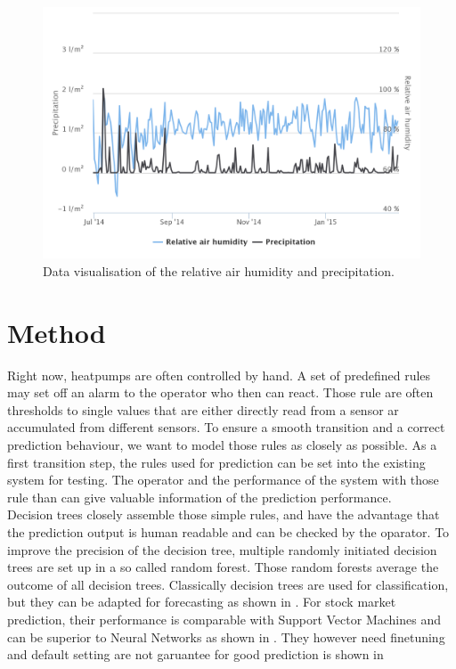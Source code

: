 \documentclass{scrartcl}
\begin{document}
\begin{figure}[H]
  \centering
  \includegraphics[width=0.8\linewidth]{img/humidity.png}
  \caption{Data visualisation of the relative air humidity and precipitation.}
  \label{fig:humidity}
\end{figure}


\section{Method}
Right now, heatpumps are often controlled by hand. A set of predefined rules may set off an alarm to the operator who then can react. Those rule are often thresholds to single values that are either directly read from a sensor ar accumulated from different sensors. To ensure a smooth transition and a correct prediction behaviour, we want to model those rules as closely as possible. As a first transition step, the rules used for prediction can be set into the existing system for testing. The operator and the performance of the system with those rule than can give valuable information of the prediction performance.\\
Decision trees closely assemble those simple rules, and have the advantage that the prediction output is human readable and can be checked by the oparator. To improve the precision of the decision tree, multiple randomly initiated decision trees are set up in a so called random forest. Those random forests average the outcome of all decision trees. Classically decision trees are used for classification, but they can be adapted for forecasting as shown in \cite{pant1990innocents}. For stock market prediction, their performance is comparable with Support Vector Machines and can be superior to Neural Networks as shown in \cite{kumar2006forecasting}. They however need finetuning and default setting are not garuantee for good prediction is shown in \cite{segal2004machine}
\end{document}
